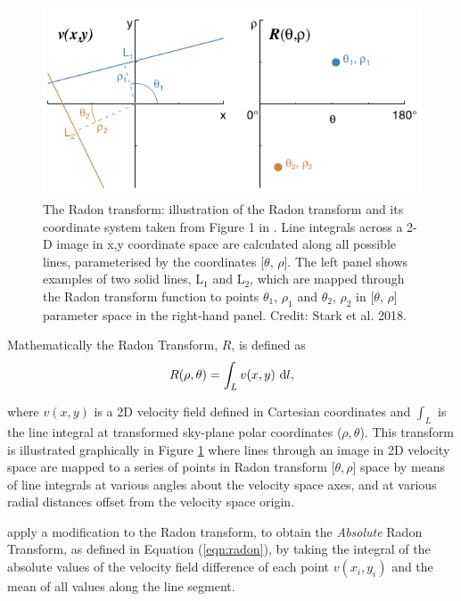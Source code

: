 \begin{figure}
    \centering
    \includegraphics[width=\columnwidth]{images/RadonPlots/Radon-transform-Stark.png}
    \caption[The Radon transform and its coordinate system]{The Radon transform: illustration of the Radon transform and its coordinate system taken from Figure 1 in \citet{2018MNRAS.480.2217S}. Line integrals across a 2-D image in x,y coordinate space are calculated along all possible lines, parameterised by the coordinates [$\theta$, $\rho$]. The left panel shows examples of two solid lines, L$_1$ and L$_2$, which are mapped through the Radon transform function to points $\theta_1$, $\rho_1$ and $\theta_2$, $\rho_2$ in [$\theta$, $\rho$] parameter space in the right-hand panel. Credit: Stark et al. 2018.}
    \label{fig:RadonTransform}
\end{figure}

Mathematically the Radon Transform, $R$, is defined as
\begin{equation}
    \label{eqn:radon}
    R(\rho,\theta)=\int_{L}{v(x,y)\, \mathop{}\!\mathrm{d} l},
\end{equation}

where $v(x,y)$ is a 2D velocity field defined in Cartesian coordinates and $\int_{L}$ is the line integral at transformed sky-plane polar coordinates ($\rho,\theta$). This transform is illustrated graphically in Figure \ref{fig:RadonTransform} where lines through an image in 2D velocity space are mapped to a series of points in Radon transform [$\theta,\rho$] space by means of line integrals at various angles about the velocity space axes, and at various radial distances offset from the velocity space origin. 


\citet{2018MNRAS.480.2217S} apply a modification to the Radon transform, to obtain the \textit{Absolute} Radon Transform, as defined in Equation (\ref{eqn:radon}), by taking the integral of the absolute values of the velocity field difference of each point $v(x_i,y_i)$ and the mean of all values along the line segment.

